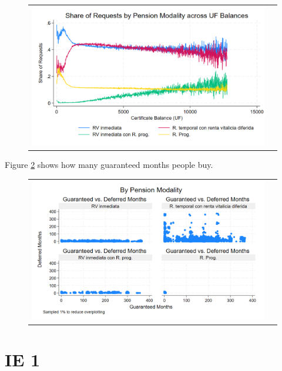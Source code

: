 \documentclass[12pt]{article}
\begin{document}
\begin{figure}[H] \label{fig:ie0_4}
\caption{}
\centering{}%
\begin{tabular}{cc}
\includegraphics[scale=0.27]{figures/IE0_plot4.png}
\end{tabular}
\end{figure}

Figure \ref{fig:ie0_5} shows how many guaranteed months people buy. 
\begin{figure}[H] \label{fig:ie0_5}
\caption{}
\centering{}%
\begin{tabular}{cc}
\includegraphics[scale=0.27]{figures/IE0_plot5.png}
\end{tabular}
\end{figure}

\section{IE 1}
\end{document}
